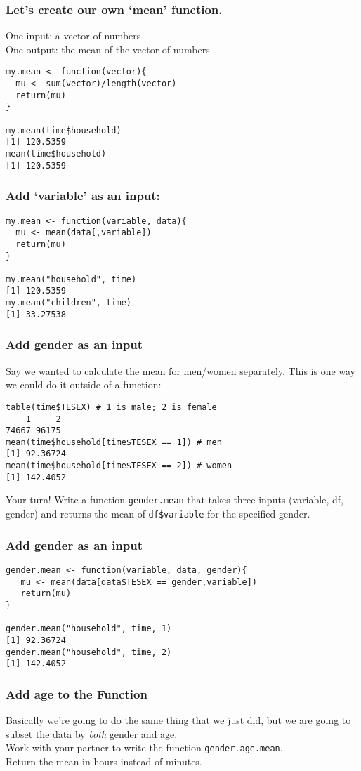 \documentclass[handout,compress]{beamer}
\begin{document}
\begin{frame}[fragile]
 \frametitle{Let's create our own `mean' function.}
One input: a vector of numbers \\
One output: the mean of the vector of numbers
\begin{verbatim}
my.mean <- function(vector){
  mu <- sum(vector)/length(vector)
  return(mu)
}

my.mean(time$household)
[1] 120.5359
mean(time$household)
[1] 120.5359
\end{verbatim}
\end{frame}



\begin{frame}[fragile]
 \frametitle{Add `variable' as an input:}
\begin{verbatim}
my.mean <- function(variable, data){
  mu <- mean(data[,variable])
  return(mu)
}

my.mean("household", time)
[1] 120.5359
my.mean("children", time)
[1] 33.27538
\end{verbatim}
\end{frame}


\begin{frame}[fragile]
 \frametitle{Add gender as an input}
 Say we wanted to calculate the mean for men/women separately. This is one way we could do it outside of a function:
\begin{verbatim}
table(time$TESEX) # 1 is male; 2 is female
    1     2 
74667 96175 
mean(time$household[time$TESEX == 1]) # men
[1] 92.36724
mean(time$household[time$TESEX == 2]) # women
[1] 142.4052
\end{verbatim} \pause
\alert{Your turn!} Write a function \texttt{gender.mean} that takes three inputs (variable, df, gender) and returns the mean of \texttt{df\$variable} for the specified gender.
\end{frame}

\begin{frame}[fragile]
 \frametitle{Add gender as an input}
\begin{verbatim}
gender.mean <- function(variable, data, gender){
   mu <- mean(data[data$TESEX == gender,variable])
   return(mu)
}

gender.mean("household", time, 1)
[1] 92.36724
gender.mean("household", time, 2)
[1] 142.4052
\end{verbatim}
\end{frame}

\begin{frame}[fragile]
 \frametitle{Add age to the Function}
 Basically we're going to do the same thing that we just did, but we are going to subset the data by \textit{both} gender and \alert{age}. \\
 \bigskip
 Work with your partner to write the function \texttt{gender.age.mean}. \\
 \bigskip
 Return the mean in \alert{hours} instead of minutes. 
\end{frame}
\end{document}
